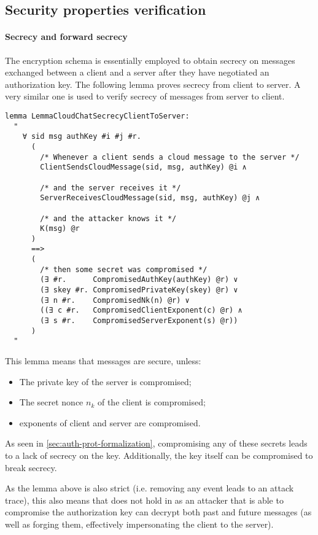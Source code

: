 \subsection{Security properties verification}

\paragraph{Secrecy and forward secrecy} The \cchat{} encryption schema is essentially employed to obtain secrecy on messages exchanged between a client and a server after they have negotiated an authorization key.
The following lemma proves secrecy from client to server. A very similar one is used to verify secrecy of messages from server to client.

\begin{lstlisting}
lemma LemmaCloudChatSecrecyClientToServer:
  "
    ∀ sid msg authKey #i #j #r.
      (
        /* Whenever a client sends a cloud message to the server */
        ClientSendsCloudMessage(sid, msg, authKey) @i ∧

        /* and the server receives it */
        ServerReceivesCloudMessage(sid, msg, authKey) @j ∧

        /* and the attacker knows it */
        K(msg) @r
      )
      ==>
      (
        /* then some secret was compromised */
        (∃ #r.      CompromisedAuthKey(authKey) @r) ∨
        (∃ skey #r. CompromisedPrivateKey(skey) @r) ∨
        (∃ n #r.    CompromisedNk(n) @r) ∨
        ((∃ c #r.   CompromisedClientExponent(c) @r) ∧
        (∃ s #r.    CompromisedServerExponent(s) @r))
      )
  "
\end{lstlisting}

This lemma means that messages are secure, unless:
\begin{itemize}
  \item The private key of the server is compromised;
  \item The secret nonce $n_k$ of the client is compromised;
  \item \DiHe{} exponents of client and server are compromised.
\end{itemize}

As seen in \cref{sec:auth-prot-formalization}, compromising any of these secrets leads to a lack of secrecy on the key. Additionally, the key itself can be compromised to break \cchats{} secrecy.

As the lemma above is also strict (i.e. removing any event leads to an attack trace), this also means that \pfs{} does not hold in \cchats{} as an attacker that is able to compromise the authorization key can decrypt both past and future messages (as well as forging them, effectively impersonating the client to the server).






